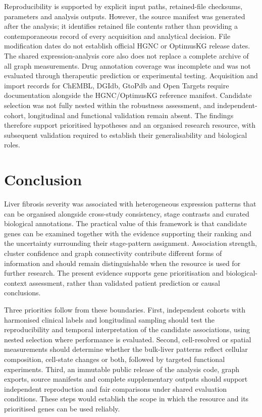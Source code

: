 \documentclass[11pt,a4paper]{article}
\begin{document}
Reproducibility is supported by explicit input paths, retained-file checksums, parameters and analysis outputs. However, the source manifest was generated after the analysis; it identifies retained file contents rather than providing a contemporaneous record of every acquisition and analytical decision. File modification dates do not establish official HGNC or OptimusKG release dates. The shared expression-analysis core also does not replace a complete archive of all graph measurements. Drug annotation coverage was incomplete and was not evaluated through therapeutic prediction or experimental testing. Acquisition and import records for ChEMBL, DGIdb, GtoPdb and Open Targets require documentation alongside the HGNC/OptimusKG reference manifest. Candidate selection was not fully nested within the robustness assessment, and independent-cohort, longitudinal and functional validation remain absent. The findings therefore support prioritised hypotheses and an organised research resource, with subsequent validation required to establish their generalisability and biological roles.

\section*{Conclusion}
Liver fibrosis severity was associated with heterogeneous expression patterns that can be organised alongside cross-study consistency, stage contrasts and curated biological annotations. The practical value of this framework is that candidate genes can be examined together with the evidence supporting their ranking and the uncertainty surrounding their stage-pattern assignment. Association strength, cluster confidence and graph connectivity contribute different forms of information and should remain distinguishable when the resource is used for further research. The present evidence supports gene prioritisation and biological-context assessment, rather than validated patient prediction or causal conclusions.

Three priorities follow from these boundaries. First, independent cohorts with harmonised clinical labels and longitudinal sampling should test the reproducibility and temporal interpretation of the candidate associations, using nested selection where performance is evaluated. Second, cell-resolved or spatial measurements should determine whether the bulk-liver patterns reflect cellular composition, cell-state changes or both, followed by targeted functional experiments. Third, an immutable public release of the analysis code, graph exports, source manifests and complete supplementary outputs should support independent reproduction and fair comparisons under shared evaluation conditions. These steps would establish the scope in which the resource and its prioritised genes can be used reliably.
\end{document}
